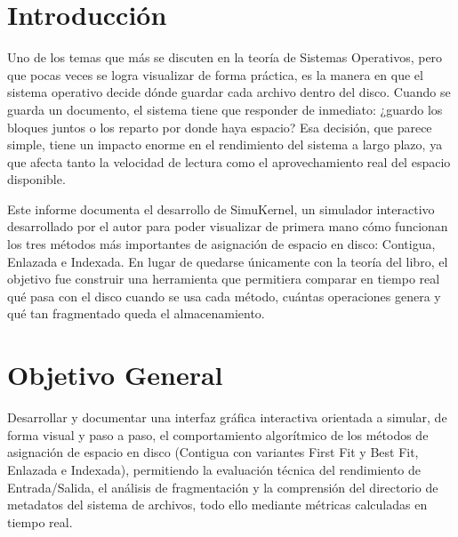 \documentclass[12pt,a4paper]{article}
\begin{document}
\newpage
\doublespacing
\setlength{\parindent}{1.27cm}

\section{Introducción}

Uno de los temas que más se discuten en la teoría de Sistemas Operativos, pero que pocas veces se logra visualizar de forma práctica, es la manera en que el sistema operativo decide dónde guardar cada archivo dentro del disco. Cuando se guarda un documento, el sistema tiene que responder de inmediato: ¿guardo los bloques juntos o los reparto por donde haya espacio? Esa decisión, que parece simple, tiene un impacto enorme en el rendimiento del sistema a largo plazo, ya que afecta tanto la velocidad de lectura como el aprovechamiento real del espacio disponible.

Este informe documenta el desarrollo de SimuKernel, un simulador interactivo desarrollado por el autor para poder visualizar de primera mano cómo funcionan los tres métodos más importantes de asignación de espacio en disco: Contigua, Enlazada e Indexada. En lugar de quedarse únicamente con la teoría del libro, el objetivo fue construir una herramienta que permitiera comparar en tiempo real qué pasa con el disco cuando se usa cada método, cuántas operaciones genera y qué tan fragmentado queda el almacenamiento.

\section{Objetivo General}

Desarrollar y documentar una interfaz gráfica interactiva orientada a simular, de forma visual y paso a paso, el comportamiento algorítmico de los métodos de asignación de espacio en disco (Contigua con variantes First Fit y Best Fit, Enlazada e Indexada), permitiendo la evaluación técnica del rendimiento de Entrada/Salida, el análisis de fragmentación y la comprensión del directorio de metadatos del sistema de archivos, todo ello mediante métricas calculadas en tiempo real.

\end{document}
